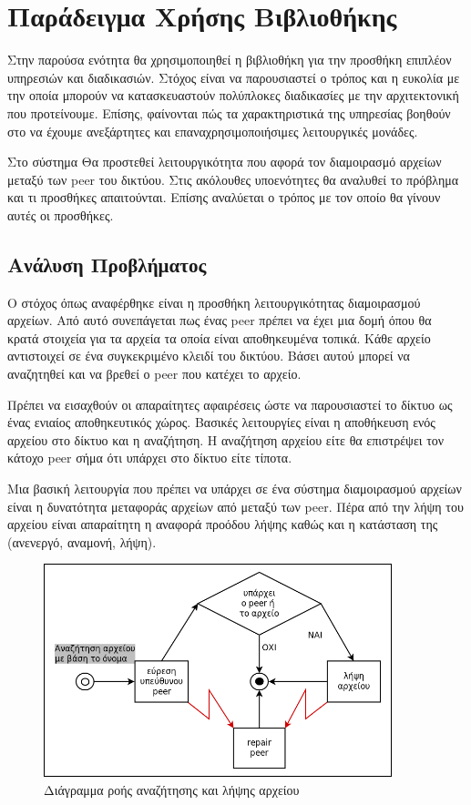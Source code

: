 \chapter{Παράδειγμα Χρήσης Βιβλιοθήκης}
\label{chap:Demo}

Στην παρούσα ενότητα θα χρησιμοποιηθεί η βιβλιοθήκη για την 
προσθήκη επιπλέον υπηρεσιών και διαδικασιών. Στόχος είναι να 
παρουσιαστεί ο τρόπος και η ευκολία με την οποία μπορούν να 
κατασκευαστούν πολύπλοκες διαδικασίες με την αρχιτεκτονική που 
προτείνουμε. Επίσης, φαίνονται πώς τα χαρακτηριστικά της υπηρεσίας 
βοηθούν στο να έχουμε ανεξάρτητες και επαναχρησιμοποιήσιμες λειτουργικές 
μονάδες.

Στο σύστημα Θα προστεθεί λειτουργικότητα που αφορά τον 
διαμοιρασμό αρχείων μεταξύ των peer του δικτύου. Στις ακόλουθες 
υποενότητες θα αναλυθεί το πρόβλημα και τι προσθήκες απαιτούνται. Επίσης 
αναλύεται ο τρόπος με τον οποίο θα γίνουν αυτές οι προσθήκες.

\section{Ανάλυση Προβλήματος}

Ο στόχος όπως αναφέρθηκε είναι η προσθήκη λειτουργικότητας 
διαμοιρασμού αρχείων. Από αυτό συνεπάγεται πως ένας peer πρέπει να έχει 
μια δομή όπου θα κρατά στοιχεία για τα αρχεία τα οποία είναι 
αποθηκευμένα τοπικά. Κάθε αρχείο αντιστοιχεί σε ένα συγκεκριμένο κλειδί 
του δικτύου. Βάσει αυτού μπορεί να αναζητηθεί και να βρεθεί ο peer που 
κατέχει το αρχείο.

Πρέπει να εισαχθούν οι απαραίτητες αφαιρέσεις ώστε να 
παρουσιαστεί το δίκτυο ως ένας ενιαίος αποθηκευτικός χώρος. Βασικές 
λειτουργίες είναι η αποθήκευση ενός αρχείου στο δίκτυο και η αναζήτηση. 
Η αναζήτηση αρχείου είτε θα επιστρέψει τον κάτοχο peer σήμα ότι υπάρχει 
στο δίκτυο είτε τίποτα.

Μια βασική λειτουργία που πρέπει να υπάρχει σε ένα σύστημα διαμοιρασμού 
αρχείων είναι η δυνατότητα μεταφοράς αρχείων από μεταξύ των peer. Πέρα 
από την λήψη του αρχείου είναι απαραίτητη η αναφορά προόδου λήψης καθώς 
και η κατάσταση της (ανενεργό, αναμονή, λήψη). 

\begin{figure}[htbp]
  \begin{center}
    \includegraphics[width=0.9\textwidth]{Figures/Demo/Workflow.png}
  \end{center}
  \caption{Διάγραμμα ροής αναζήτησης και λήψης αρχείου}
  \label{fig:Workflow}
\end{figure}

